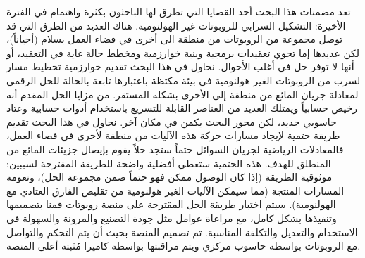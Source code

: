 تعد مضمنات هذا البحث أحد القضايا التي تطرق لها الباحثون بكثرة واهتمام في الفترة الأخيرة: التشكيل السرابي للروبوتات غير الهولنومية.  هناك العديد من الطرق التي قد توصل مجموعة من الروبوتات من منطقة الى أخرى في فضاء العمل بسلام (أحياناً)، لكن عديدها إما تحوي تعقيدات برمجية وبنية خوارزمية ومخطط حالة غاية في التعقيد، أو أنها لا توفر حل في أغلب الأحوال. نحاول في هذا البحث تقديم خوارزمية تخطيط مسار لسرب من الروبوتات الغير هولنومية في بيئة مكتظة باعتبارها تابعة بالحالة للحل الرقمي لمعادلة جريان المائع من منطقة إلى الأخرى بشكله المستقر.
من مزايا الحل المقدم أنه رخيص حسابياً ويمتلك العديد من العناصر القابلة للتسريع باستخدام أدوات حسابية وعتاد حاسوبي جديد، لكن محور البحث يكمن في مكان آخر. نحاول في هذا البحث تقديم طريقة حتمية لإيجاد مسارات حركة هذه الآليات من منطقة لأخرى في فضاء العمل، فالمعادلات الرياضية لجريان السوائل حتماً ستجد حلاً يقوم بإيصال جزيئات المائع من المنطلق للهدف. هذه الحتمية ستعطي أفضلية واضحة للطريقة المقترحة لسببين: موثوقية الطريقة (إذا كان الوصول ممكن فهو حتماً ضمن مجموعة الحل)، ونعومة المسارات المنتجة (مما سيمكن الآليات الغير هولنومية من تقليص الفارق العتادي مع الهولنومية).
سيتم اختبار طريقة الحل المقترحة على منصة روبوتات قمنا بتصميمها وتنفيذها بشكل كامل، مع مراعاة عوامل مثل جودة التصنيع والمرونة والسهولة في الاستخدام والتعديل والتكلفة المناسبة. تم تصميم المنصة بحيث أن يتم التحكم والتواصل مع الروبوتات بواسطة حاسوب مركزي ويتم مراقبتها بواسطة كاميرا مُثبتة أعلى المنصة.

